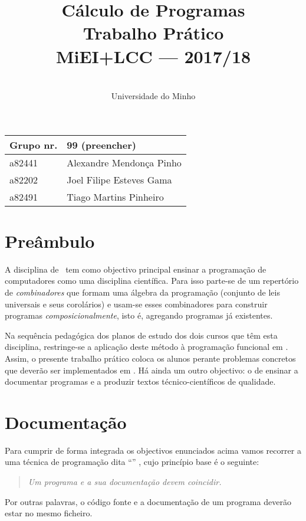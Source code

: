 \documentclass[a4paper]{article}
\title{
       	    Cálculo de Programas
\\
       	Trabalho Prático
\\
       	MiEI+LCC --- 2017/18
}
\author{
       	\dium
\\
       	Universidade do Minho
}
\date\mydate
\begin{document}
\maketitle

\begin{center}\large
\begin{tabular}{ll}
\textbf{Grupo} nr. & 99 (preencher)
\\\hline
a82441 & Alexandre Mendonça Pinho
\\
a82202 & Joel Filipe Esteves Gama
\\
a82491 & Tiago Martins Pinheiro
\end{tabular}
\end{center}

\section{Preâmbulo}

A disciplina de \CP\ tem como objectivo principal ensinar
a progra\-mação de computadores como uma disciplina científica. Para isso
parte-se de um repertório de \emph{combinadores} que formam uma álgebra da
programação (conjunto de leis universais e seus corolários) e usam-se esses
combinadores para construir programas \emph{composicionalmente}, isto é,
agregando programas já existentes.
  
Na sequência pedagógica dos planos de estudo dos dois cursos que têm esta
disciplina, restringe-se a aplicação deste método à programação funcional
em \Haskell. Assim, 
o presente trabalho prático coloca os alunos perante problemas
concretos que deverão ser implementados em \Haskell.
Há ainda um outro objectivo: o de ensinar a documentar programas e
a produzir textos técnico-científicos de qualidade.

\section{Documentação}
Para cumprir de forma integrada os objectivos enunciados acima vamos recorrer
a uma técnica de programa\-ção dita ``'' \cite{Kn92}, cujo
princípio base é o seguinte:
\begin{quote}\em
Um programa e a sua documentação devem coincidir.
\end{quote}
Por outras palavras, o código fonte e a documentação de um programa deverão estar no
mesmo ficheiro.
\end{document}
